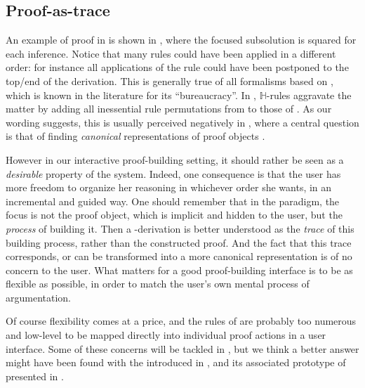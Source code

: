 \subsection{Proof-as-trace}

An example of proof in  is shown in , where the
focused subsolution is squared for each inference. Notice that many rules could
have been applied in a different order: for instance all applications of the
{} rule could have been postponed to the top/end of the derivation.
This is generally true of all formalisms based on , which is known in the
 literature for its ``bureaucracy''. In ,
$\mathbb{H}$-rules aggravate the matter by adding all inessential rule
permutations from  to those of . As our wording suggests,
this is usually perceived negatively in  , where a
central question is that of finding \emph{canonical} representations of proof
objects .

However in our interactive proof-building setting, it should rather be seen as a
\emph{desirable} property of the system. Indeed, one consequence is that the
user has more freedom to organize her reasoning in whichever order she wants, in
an incremental and guided way. One should remember that in the 
paradigm, the focus is not the proof object, which is implicit and hidden to the
user, but the \emph{process} of building it. Then a -derivation is
better understood as the \emph{trace} of this building process, rather than the
constructed proof. And the fact that this trace corresponds, or
can be transformed into a more canonical representation is of no concern to the
user. What matters for a good proof-building interface is to be as flexible as
possible, in order to match the user's own mental process of argumentation.

Of course flexibility comes at a price, and the rules of  are probably
too numerous and low-level to be mapped directly into individual proof actions
in a user interface. Some of these concerns will be tackled in
, but we think a better answer might have been found
with the  introduced in , and its associated
prototype of  presented in .

